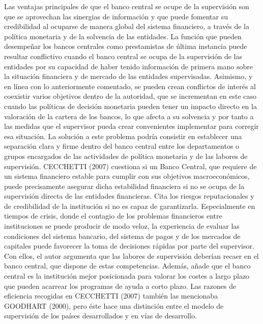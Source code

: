 \documentclass[10pt,a4paper]{article}
\begin{document}
Las ventajas principales de que el banco central se ocupe de la supervisión son que se aprovechan las sinergias de información y que puede fomentar su credibilidad al ocuparse de manera global del sistema financiero, a través de la política monetaria y de la solvencia de las entidades. La función que pueden desempeñar los bancos centrales como prestamistas de última instancia puede resultar conflictivo cuando el banco central se ocupa de la supervisión de las entidades por su capacidad de haber tenido información de primera mano sobre la situación financiera y de mercado de las entidades supervisadas. Asimismo, y en línea con lo anteriormente comentado, se pueden crean conflictos de interés al coexistir varios objetivos dentro de la autoridad, que se incrementan en este caso cuando las políticas de decisión monetaria pueden tener un impacto directo en la valoración de la cartera de los bancos, lo que afecta a su solvencia y por tanto a las medidas que el supervisor pueda crear convenientes implementar para corregir esa situación. La solución a este problema podría consistir en establecer una separación clara y firme dentro del banco central entre los departamentos o grupos encargados de las actividades de política monetaria y de las labores de supervisión. CECCHETTI (2007) cuestiona si un Banco Central, que requiere de un sistema financiero estable para cumplir con sus objetivos macroeconómicos, puede precisamente asegurar dicha estabilidad financiera si no se ocupa de la supervisión directa de las entidades financieras. Cita los riesgos reputacionales y de credibilidad de la institución si no es capaz de garantizarla. Especialmente en tiempos de crisis, donde el contagio de los problemas financieros entre instituciones se puede producir de modo veloz, la experiencia de evaluar las condiciones del sistema bancario, del sistema de pagos y de los mercados de capitales puede favorecer la toma de decisiones rápidas por parte del supervisor. Con ellos, el autor argumenta que las labores de supervisión deberían recaer en el banco central, que dispone de estas competencias. Además, añade que el banco central es la institución mejor posicionada para valorar los costes a largo plazo que pueden acarrear los programas de ayuda a corto plazo. Las razones de eficiencia recogidas en CECCHETTI (2007) también las mencionaba GOODHART (2000), pero éste hace una distinción entre el modelo de supervisión de los países desarrollados y en vías de desarrollo. 
\end{document}
